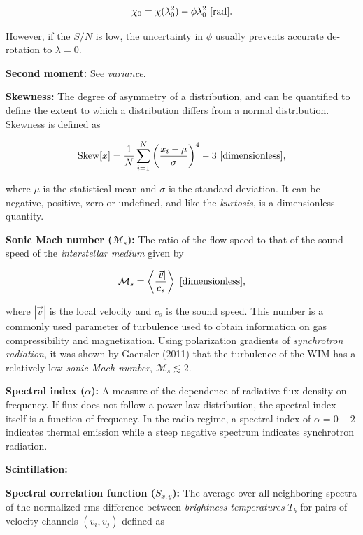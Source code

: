 \documentclass[a4paper,10pt]{article}
\begin{document}
\begin{align*}
    \chi_0 = \chi(\lambda_0^2) - \phi\lambda_0^2 ~ [{\rm rad}].
\end{align*}

{\noindent}However, if the $S/N$ is low, the uncertainty in $\phi$ usually prevents accurate de-rotation to $\lambda=0$. 

{\noindent}\textbf{Second moment:} See \textit{variance}.

{\noindent}\textbf{Skewness:} The degree of asymmetry of a distribution, and can be quantified to define the extent to which a distribution differs from a normal distribution. Skewness is defined as

\begin{align*}
    {\rm Skew}[x] = \frac{1}{N} \sum_{i=1}^N \left(\frac{x_i-\mu}{\sigma}\right)^4 -3 ~ [{\rm dimensionless}],
\end{align*}

{\noindent}where $\mu$ is the statistical mean and $\sigma$ is the standard deviation. It can be negative, positive, zero or undefined, and like the \textit{kurtosis}, is a dimensionless quantity.

{\noindent}\textbf{Sonic Mach number ($\mathcal{M}_s$):} The ratio of the flow speed to that of the sound speed of the \textit{interstellar medium} given by

\begin{align*}
    \mathcal{M}_s = \left\langle\frac{\lvert\vec{v}\rvert}{c_s}\right\rangle ~ [{\rm dimensionless}],
\end{align*}

{\noindent}where $|\vec{v}|$ is the local velocity and $c_s$ is the sound speed. This number is a commonly used parameter of turbulence used to obtain information on gas compressibility and magnetization. Using polarization gradients of \textit{synchrotron radiation}, it was shown by Gaensler (2011) that the turbulence of the WIM has a relatively low \textit{sonic Mach number}, $\mathcal{M}_s\lesssim2$.

{\noindent}\textbf{Spectral index ($\alpha$):} A measure of the dependence of radiative flux density on frequency. If flux does not follow a power-law distribution, the spectral index itself is a function of frequency. In the radio regime, a spectral index of $\alpha=0-2$ indicates thermal emission while a steep negative spectrum indicates synchrotron radiation.

{\noindent}\textbf{Scintillation:}

{\noindent}\textbf{Spectral correlation function ($S_{x,y}$):} The average over all neighboring spectra of the normalized rms difference between \textit{brightness temperatures} $T_b$ for pairs of velocity channels $(v_i,v_j)$ defined as
\end{document}
